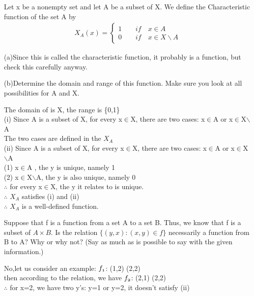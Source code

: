 \documentclass[11pt, a4paper, UTF8]{ctexart}
\begin{document}
\begin{problem}[UD:13.5]
Let x be a nonempty set and let A be a subset of X. We define the Characteristic function of the set A by
\begin{align}
X_{A}(x) = 
\begin{cases}
1 \qquad if \quad x \in A\\
0 \qquad if \quad x \in X \backslash A
\end{cases}
\end{align}

(a)Since this is called the characteristic function, it probably is a function, but check this carefully anyway.

(b)Determine the domain and range of this function. Make sure you look at all possibilities for A and X.
\end{problem}
\begin{solution}
The domain of is X, the range is \{0,1\}\\
(i) Since A is a subset of X, for every x$\in$X, there are two cases: x$\in$A or x$\in$X$\backslash$A\\
The two cases are defined in the $X_A$\\
(ii) Since A is a subset of X, for every x$\in$X, there are two cases: x$\in$A or x$\in$X$\backslash$A\\
(1) x$\in$A , the y is unique, namely 1\\
(2) x$\in$X$\backslash$A, the y is also unique, namely 0\\
$\therefore$ for every x$\in$X, the y it relates to is unique.\\
$\therefore$ $X_A$ satisfies (i) and (ii)\\
$\therefore$ $X_A$ is a well-defined function. 
\end{solution}


\begin{problem}[UD:13.11]
Suppose that f is a function from a set A to a set B. Thus, we know that f is a subset of \(A \times B\). Is the relation \(\{(y,x) : (x,y) \in f\}\) necessarily a function from B to A? Why or why not? (Say as much as is possible to say with the given information.)
\end{problem}
\begin{solution}
No,let us consider an example: $\mathnormal{f_1}$: (1,2) (2,2)\\
then according to the relation, we have $\mathnormal{f_2}$: (2,1) (2,2)\\
$\therefore$ for x=2, we have two y's: y=1 or y=2, it doesn't satisfy (ii)\\

\end{solution}
\end{document}
